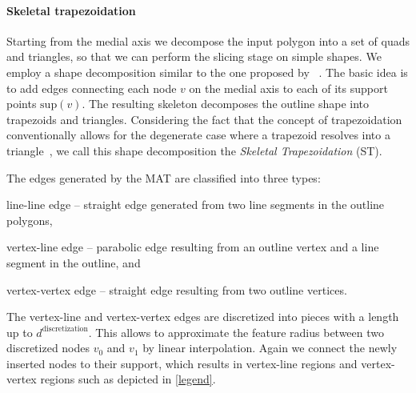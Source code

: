 \paragraph{Skeletal trapezoidation}
Starting from the medial axis we decompose the input polygon into a set of quads and triangles, so that we can perform the slicing stage on simple shapes.
We employ a shape decomposition similar to the one proposed by \citeauthor{Ding2016a}~\cite{Ding2016a}. 
The basic idea is to add edges connecting each node $v$ on the medial axis to each of its support points $\text{sup}(v)$. 
The resulting skeleton decomposes the outline shape into trapezoids and triangles.
Considering the fact that the concept of trapezoidation conventionally allows for the degenerate case where a trapezoid resolves into a triangle~\cite{chazelle1984,fournier1984}, we call this shape decomposition the \emph{Skeletal Trapezoidation} (ST).


The edges generated by the MAT are classified into three types:
\begin{enumerate*}
\item line-line edge -- straight edge generated from two line segments in the outline polygons,
\item vertex-line edge -- parabolic edge resulting from an outline vertex and a line segment in the outline, and 
\item vertex-vertex edge -- straight edge resulting from two outline vertices.
\end{enumerate*}
The vertex-line and vertex-vertex edges are discretized into pieces with a length up to $d^\text{discretization}$.
This allows to approximate the feature radius between two discretized nodes $v_0$ and $v_1$ by linear interpolation. 
Again we connect the newly inserted nodes to their support, which results in vertex-line regions and vertex-vertex regions such as depicted in \cref{legend}.






